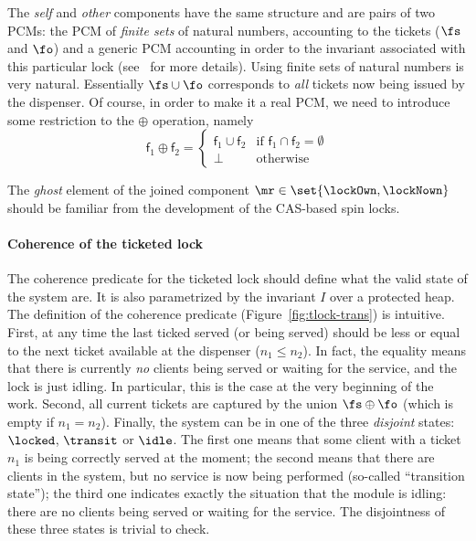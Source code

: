 The \emph{self} and \emph{other} components have the same structure
and are pairs of two PCMs: the PCM of \emph{finite sets} of natural
numbers, accounting to the tickets ($\fs$ and $\fo$) and a generic PCM
accounting in order to the invariant associated with this particular
lock (see~\cite{LeyWild-Nanevski:POPL13} for more details). Using
finite sets of natural numbers is very natural. Essentially $\fs \cup
\fo$ corresponds to \emph{all} tickets now being issued by the
dispenser. Of course, in order to make it a real PCM, we need to
introduce some restriction to the $\oplus$ operation, namely 
%
\[
\mathsf{f}_1 \oplus \mathsf{f}_2 = 
\left\{
\begin{array}{cl}
\mathsf{f}_1 \cup \mathsf{f}_2  & \text{if }  \mathsf{f}_1 \cap \mathsf{f}_2 = \emptyset \\
\bot & \text{otherwise}
\end{array}
\right.
\]

The \emph{ghost} element of the joined component $\mr \in
\set{\lockOwn, \lockNown}$ should be familiar from the development of
the CAS-based spin locks. 

\paragraph{Coherence of the ticketed lock}

The coherence predicate for the ticketed lock should define what the
valid state of the system are. It is also parametrized by the
invariant $I$ over a protected heap.  The definition of the coherence
predicate (Figure~\ref{fig:tlock-trans}) is intuitive. First, at any time the last ticked served (or
being served) should be less or equal to the next ticket available at
the dispenser ($n_1 \le n_2$). In fact, the equality means that there
is currently \emph{no} clients being served or waiting for the
service, and the lock is just idling. In particular, this is the case
at the very beginning of the work. Second, all current tickets are
captured by the union $\fs \oplus \fo$ (which is empty if $n_1 =
n_2$). Finally, the system can be in one of the three \emph{disjoint}
states: $\locked$, $\transit$ or $\idle$. The first one means that
some client with a ticket $n_1$ is being correctly served at the
moment; the second means that there are clients in the system, but no
service is now being performed (so-called ``transition state''); the
third one indicates exactly the situation that the module is idling:
there are no clients being served or waiting for the service. The
disjointness of these three states is trivial to check.


